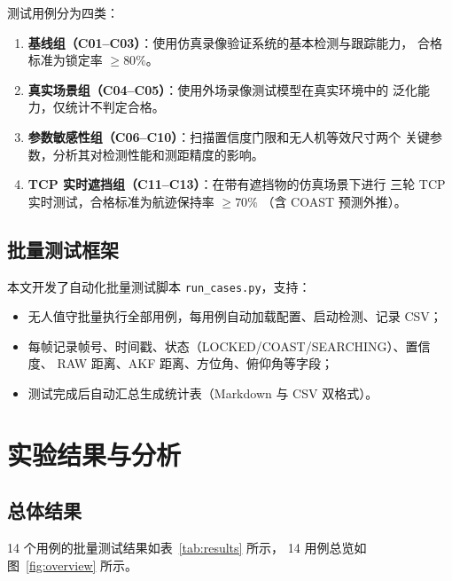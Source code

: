\documentclass[12pt, a4paper]{ctexart}
\begin{document}
测试用例分为四类：

\begin{enumerate}
  \item \textbf{基线组（C01--C03）}：使用仿真录像验证系统的基本检测与跟踪能力，
        合格标准为锁定率 $\geq 80\%$。
  \item \textbf{真实场景组（C04--C05）}：使用外场录像测试模型在真实环境中的
        泛化能力，仅统计不判定合格。
  \item \textbf{参数敏感性组（C06--C10）}：扫描置信度门限和无人机等效尺寸两个
        关键参数，分析其对检测性能和测距精度的影响。
  \item \textbf{TCP 实时遮挡组（C11--C13）}：在带有遮挡物的仿真场景下进行
        三轮 TCP 实时测试，合格标准为航迹保持率 $\geq 70\%$
        （含 COAST 预测外推）。
\end{enumerate}

\subsection{批量测试框架}

本文开发了自动化批量测试脚本 \texttt{run\_cases.py}，支持：
\begin{itemize}
  \item 无人值守批量执行全部用例，每用例自动加载配置、启动检测、记录 CSV；
  \item 每帧记录帧号、时间戳、状态（LOCKED/COAST/SEARCHING）、置信度、
        RAW 距离、AKF 距离、方位角、俯仰角等字段；
  \item 测试完成后自动汇总生成统计表（Markdown 与 CSV 双格式）。
\end{itemize}

\section{实验结果与分析}
\label{sec:results}

\subsection{总体结果}

14 个用例的批量测试结果如表~\ref{tab:results} 所示，
14 用例总览如图~\ref{fig:overview} 所示。
\end{document}
